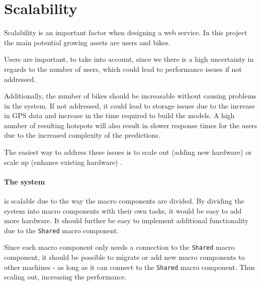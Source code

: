 \section{Scalability}
Scalability is an important factor when designing a web service. In this project the main potential growing assets are users and bikes.

Users are important, to take into account, since we there is a high uncertainty in regards to the number of users, which could lead to performance issues if not addressed.

Additionally, the number of bikes should be increasable without causing problems in the system. If not addressed, it could lead to storage issues due to the increase in GPS data and increase in the time required to build the models.
A high number of resulting hotspots will also result in slower response times for the users due to the increased complexity of the predictions.

The easiest way to address these issues is to scale out (adding new hardware) or scale up (enhance existing hardware) \cite{michael2007scale}. 

\paragraph{The system} is scalable due to the way the macro components are divided. By dividing the system into macro components with their own tasks, it would be easy to add more hardware. It should further be easy to implement additional functionality due to the \texttt{Shared} macro component.

Since each macro component only needs a connection to the \texttt{Shared} macro component, it should be possible to migrate or add new macro components to other machines - as long as it can connect to the \texttt{Shared} macro component. Thus scaling out, increasing the performance.


